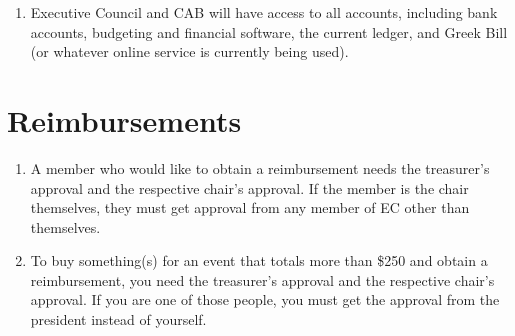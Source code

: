     \begin{enumerate}
    	\item Executive Council and CAB will have access to all accounts, including bank accounts, budgeting and financial software, the current ledger, and Greek Bill (or whatever online service is currently being used).
    \end{enumerate}
\section{Reimbursements}
	\begin{enumerate}
		\item A member who would like to obtain a reimbursement needs the treasurer’s approval and the respective chair’s approval. If the member is the chair themselves, they must get approval from any member of EC other than themselves.
    		\item To buy something(s) for an event that totals more than \$250 and obtain a reimbursement, you need the treasurer’s approval and the respective chair’s approval. If you are one of those people, you must get the approval from the president instead of yourself.
   	\end{enumerate}
